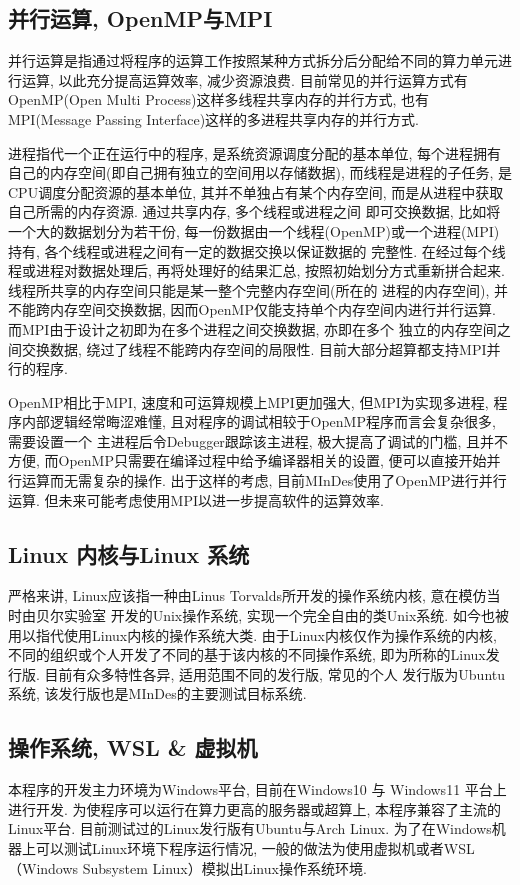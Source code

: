 \subsection{并行运算, OpenMP与MPI}
并行运算是指通过将程序的运算工作按照某种方式拆分后分配给不同的算力单元进行运算, 以此充分提高运算效率, 减少资源浪费. 目前常见的并行运算方式有
OpenMP(Open Multi Process)这样多线程共享内存的并行方式, 也有MPI(Message Passing Interface)这样的多进程共享内存的并行方式. 

进程指代一个正在运行中的程序, 是系统资源调度分配的基本单位, 每个进程拥有自己的内存空间(即自己拥有独立的空间用以存储数据), 
而线程是进程的子任务, 是CPU调度分配资源的基本单位, 其并不单独占有某个内存空间, 而是从进程中获取自己所需的内存资源. 通过共享内存, 多个线程或进程之间
即可交换数据, 比如将一个大的数据划分为若干份, 每一份数据由一个线程(OpenMP)或一个进程(MPI)持有, 各个线程或进程之间有一定的数据交换以保证数据的
完整性. 在经过每个线程或进程对数据处理后, 再将处理好的结果汇总, 按照初始划分方式重新拼合起来. 线程所共享的内存空间只能是某一整个完整内存空间(所在的
进程的内存空间), 并不能跨内存空间交换数据, 因而OpenMP仅能支持单个内存空间内进行并行运算. 而MPI由于设计之初即为在多个进程之间交换数据, 亦即在多个
独立的内存空间之间交换数据, 绕过了线程不能跨内存空间的局限性. 目前大部分超算都支持MPI并行的程序.

OpenMP相比于MPI, 速度和可运算规模上MPI更加强大, 但MPI为实现多进程, 程序内部逻辑经常晦涩难懂, 且对程序的调试相较于OpenMP程序而言会复杂很多, 需要设置一个
主进程后令Debugger跟踪该主进程, 极大提高了调试的门槛, 且并不方便, 而OpenMP只需要在编译过程中给予编译器相关的设置, 便可以直接开始并行运算而无需复杂的操作. 
出于这样的考虑, 目前MInDes使用了OpenMP进行并行运算. 但未来可能考虑使用MPI以进一步提高软件的运算效率.

\subsection{Linux 内核与Linux 系统}
严格来讲, Linux应该指一种由Linus Torvalds所开发的操作系统内核, 意在模仿当时由贝尔实验室
开发的Unix操作系统, 实现一个完全自由的类Unix系统. 如今也被用以指代使用Linux内核的操作系统大类. 由于Linux内核仅作为操作系统的内核,
不同的组织或个人开发了不同的基于该内核的不同操作系统, 即为所称的Linux发行版. 目前有众多特性各异, 适用范围不同的发行版, 常见的个人
发行版为Ubuntu系统, 该发行版也是MInDes的主要测试目标系统.

\subsection{操作系统, WSL \& 虚拟机}
本程序的开发主力环境为Windows平台, 目前在Windows10 与 Windows11 平台上进行开发. 为使程序可以运行在算力更高的服务器或超算上,
本程序兼容了主流的Linux平台. 目前测试过的Linux发行版有Ubuntu与Arch Linux. 为了在Windows机器上可以测试Linux环境下程序运行情况,
一般的做法为使用虚拟机或者WSL（Windows Subsystem Linux）模拟出Linux操作系统环境.

